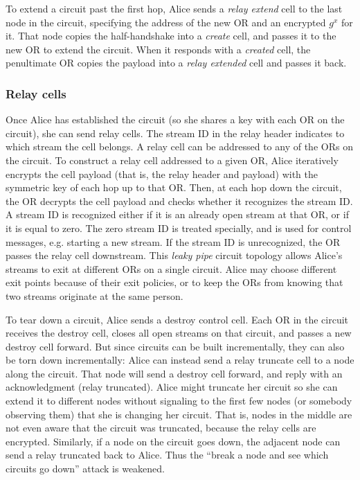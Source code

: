 \documentclass[times,10pt,twocolumn]{article}
\begin{document}
To extend a circuit past the first hop, Alice sends a \emph{relay extend}
cell to the last node in the circuit, specifying the address of the new
OR and an encrypted $g^x$ for it. That node copies the half-handshake
into a \emph{create} cell, and passes it to the new OR to extend the
circuit. When it responds with a \emph{created} cell, the penultimate OR
copies the payload into a \emph{relay extended} cell and passes it back.

\subsubsection{Relay cells}
Once Alice has established the circuit (so she shares a key with each
OR on the circuit), she can send relay cells.
The stream ID in the relay header indicates to which stream the cell belongs.
A relay cell can be addressed to any of the ORs on the circuit. To
construct a relay cell addressed to a given OR, Alice iteratively
encrypts the cell payload (that is, the relay header and payload)
with the symmetric key of each hop up to that OR. Then, at each hop
down the circuit, the OR decrypts the cell payload and checks whether
it recognizes the stream ID.  A stream ID is recognized either if it
is an already open stream at that OR, or if it is equal to zero. The
zero stream ID is treated specially, and is used for control messages,
e.g. starting a new stream. If the stream ID is unrecognized, the OR
passes the relay cell downstream. This \emph{leaky pipe} circuit topology
allows Alice's streams to exit at different ORs on a single circuit.  
Alice may choose different exit points because of their exit policies,
or to keep the ORs from knowing that two streams
originate at the same person.

To tear down a circuit, Alice sends a destroy control cell. Each OR
in the circuit receives the destroy cell, closes all open streams on
that circuit, and passes a new destroy cell forward. But since circuits
can be built incrementally, they can also be torn down incrementally:
Alice can instead send a relay truncate cell to a node along the circuit. That
node will send a destroy cell forward, and reply with an acknowledgment
(relay truncated). Alice might truncate her circuit so she can extend it
to different nodes without signaling to the first few nodes (or somebody
observing them) that she is changing her circuit. That is, nodes in the
middle are not even aware that the circuit was truncated, because the
relay cells are encrypted. Similarly, if a node on the circuit goes down,
the adjacent node can send a relay truncated back to Alice. Thus the
``break a node and see which circuits go down'' attack is weakened.
\end{document}
